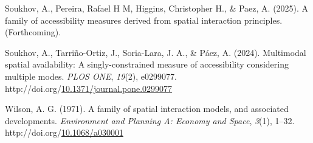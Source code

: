 \documentclass[
11pt, %
oneside, %
english, %
singlespacing, %
]{macthesis} %
\newlength{\cslhangindent}
\newenvironment{CSLReferences}[2] %
{\begin{list}{}{%
	\setlength{\itemindent}{0pt}
	\setlength{\leftmargin}{0pt}
	\setlength{\parsep}{0pt}
	\ifodd #1
	\setlength{\leftmargin}{\cslhangindent}
	\setlength{\itemindent}{-1\cslhangindent}
	\fi
	\setlength{\itemsep}{#2\baselineskip}}}
{\end{list}}
\begin{document}
\begin{CSLReferences}{1}{0}
Soukhov, A., Pereira, Rafael H M, Higgins, Christopher H., \& Paez, A. (2025). A family of accessibility measures derived from spatial interaction principles. (Forthcoming).

Soukhov, A., Tarriño-Ortiz, J., Soria-Lara, J. A., \& Páez, A. (2024). Multimodal spatial availability: A singly-constrained measure of accessibility considering multiple modes. \emph{{PLOS} {ONE}}, \emph{19}(2), e0299077. http://doi.org/\href{https://doi.org/10.1371/journal.pone.0299077}{10.1371/journal.pone.0299077}

Wilson, A. G. (1971). A family of spatial interaction models, and associated developments. \emph{Environment and Planning A: Economy and Space}, \emph{3}(1), 1--32. http://doi.org/\href{https://doi.org/10.1068/a030001}{10.1068/a030001}

\end{CSLReferences}
\end{document}
